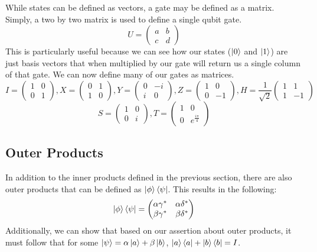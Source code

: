 \documentclass{article}
\begin{document}
While states can be defined as vectors, a gate may be defined as a matrix. Simply, a two by two matrix is used to define a single qubit gate.
\[
    U = 
    \begin{pmatrix}
        a & b \\
        c & d
    \end{pmatrix}
\]
This is particularly useful because we can see how our states ($\ket{0}$ and $\ket{1}$) are just basis vectors that when multiplied by our gate will return us a single column of that gate. We can now define many of our gates as matrices.
\[
    I = 
    \begin{pmatrix}
        1 & 0 \\
        0 & 1
    \end{pmatrix}, 
    X = 
    \begin{pmatrix}
        0 & 1 \\
        1 & 0
    \end{pmatrix}, 
    Y = 
    \begin{pmatrix}
        0 & -i \\
        i & 0
    \end{pmatrix},
    Z = 
    \begin{pmatrix}
        1 & 0 \\
        0 & -1
    \end{pmatrix},
    H = \frac{1}{\sqrt{2}}
    \begin{pmatrix}
        1 & 1 \\
        1 & -1
    \end{pmatrix}
\]
\[
    S = 
    \begin{pmatrix}
        1 & 0 \\
        0 & i
    \end{pmatrix},
    T = 
    \begin{pmatrix}
        1 & 0 \\
        0 & e^{\frac{i\pi}{4}}
    \end{pmatrix}
\]

\subsection{Outer Products}

In addition to the inner products defined in the previous section, there are also outer products that can be defined as $\ket{\phi}\bra{\psi}$. This results in the following:
\[
    \ket{\phi}\bra{\psi}= 
    \begin{pmatrix}
        \alpha\gamma^* & \alpha\delta^*\\
        \beta\gamma^* & \beta\delta^*
    \end{pmatrix}
\]
Additionally, we can show that based on our assertion about outer products, it must follow that for some $\ket{\psi} = \alpha\ket{a}+\beta\ket{b}$, $\ket{a}\bra{a} + \ket{b}\bra{b} = I$. 
\end{document}
